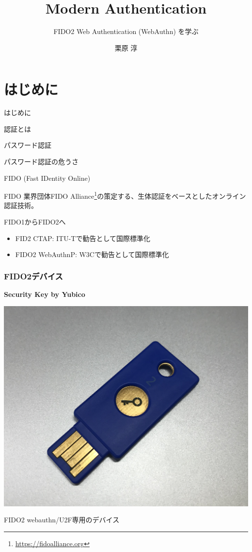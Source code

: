 \documentclass[12pt,dvipdfmx,uplatex]{beamer}
\title[Modern Authentication]{Modern Authentication}
\subtitle{FIDO2 Web Authentication (WebAuthn) を学ぶ}
\author[Jun Kurihara]{栗原 淳}
\institute[U-Hyogo/Zettant]{兵庫県立大学 大学院応用情報科学研究科 \\ 株式会社ゼタント}
\date[]{}
\begin{document}
\begin{frame}
\titlepage
\end{frame}

\section{はじめに}
\begin{frame}
 \centering
 {\Large はじめに}
\end{frame}

\begin{frame}{認証とは}
 
\end{frame}

\begin{frame}{パスワード認証}
 
\end{frame}

\begin{frame}{パスワード認証の危うさ}
 
\end{frame}

\begin{frame}{FIDO (Fast IDentity Online)}

\begin{block}{\small FIDO}
業界団体FIDO Alliance\footnote[frame]{\scriptsize \url{https://fidoalliance.org}}の策定する、生体認証をベースとしたオンライン認証技術。
\end{block}

\end{frame}

\begin{frame}{FIDO1からFIDO2へ}

\begin{itemize}
 \item FID2 CTAP: ITU-Tで勧告として国際標準化
 \item \alert{FIDO2 WebAuthn}P: W3Cで勧告として国際標準化
\end{itemize}
 
\end{frame}


\begin{frame}
\frametitle{FIDO2デバイス}
\textbf{Security Key by Yubico}
\begin{center}
\includegraphics[width=0.6\linewidth]{Figs/security-key-by-yubico.png}
\end{center}
FIDO2 webauthn/U2F専用のデバイス
\end{frame}
\end{document}
